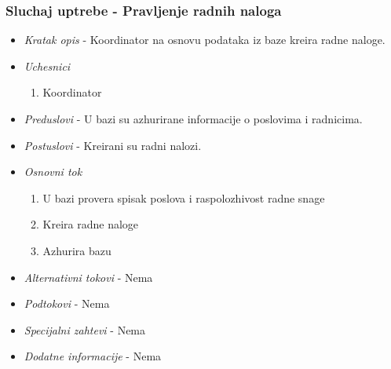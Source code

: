 \documentclass[10 pt]{article}
\begin{document}
	\subsubsection{Sluchaj uptrebe - Pravljenje radnih naloga}
	\begin{itemize}
		
		\item \textit{Kratak opis} - Koordinator na osnovu podataka iz baze kreira radne naloge.
		
		\item \textit{Uchesnici}
		\begin{enumerate}
			\item Koordinator
		\end{enumerate}
		
		\item \textit{Preduslovi} - U bazi su azhurirane informacije o poslovima i radnicima.
		
		\item \textit{Postuslovi} - Kreirani su radni nalozi.
		
		\item \textit{Osnovni tok}
		\begin{enumerate}
			\item U bazi provera spisak poslova i raspolozhivost radne snage
			\item Kreira radne naloge
			\item Azhurira bazu
		\end{enumerate}
		
		\item \textit{Alternativni tokovi} - Nema
		
		\item \textit{Podtokovi} - Nema
		
		\item \textit{Specijalni zahtevi} - Nema
		
		\item \textit{Dodatne informacije} - Nema
		
	\end{itemize}
	
\end{document}
